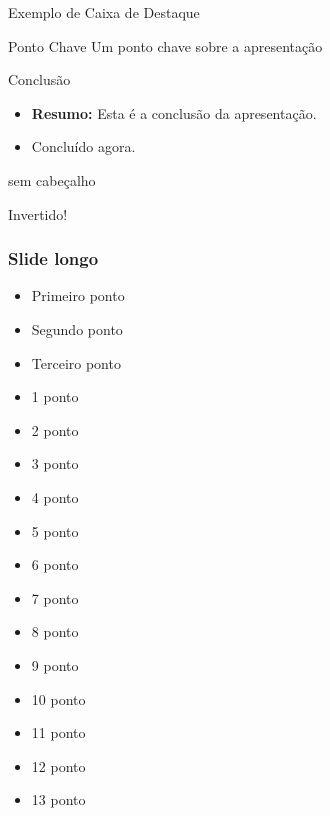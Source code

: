\documentclass[aspectratio=169]{beamer}
\begin{document}
\begin{frame}{Exemplo de Caixa de Destaque}
    \begin{alertblock}{Ponto Chave}
       Um ponto chave sobre a apresentação
    \end{alertblock}
\end{frame}

\begin{frame}{Conclusão}
    \begin{itemize}
        \item \textbf{Resumo:} Esta é a conclusão da apresentação.
        \item Concluído agora.
    \end{itemize}
\end{frame}

\begin{frame}[plain]
 sem cabeçalho
\end{frame}

\begin{frame}[standout]
	Invertido!
\end{frame}

\begin{frame}[allowframebreaks]
    \frametitle{Slide longo}
    \begin{itemize}
        \item Primeiro ponto
        \item Segundo ponto
        \item Terceiro ponto
        \item 1 ponto
        \item 2 ponto
        \item 3 ponto
        \item 4 ponto
        \item 5 ponto
        \item 6 ponto
        \item 7 ponto
        \item 8 ponto
        \item 9 ponto
        \item 10 ponto
        \item 11 ponto
        \item 12 ponto
        \item 13 ponto

    \end{itemize}
\end{frame}
\end{document}
